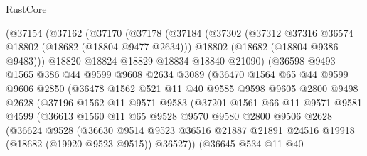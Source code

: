 \begin{lexlean}{RustCore}
\begin{coremodule}
          (@37154
            (@37162
              (@37170
                (@37178
                  (@37184
                    (@37302
                      (@37312 @37316 @36574 @18802 (@18682 (@18804 @9477 @2634)))
                      @18802
                      (@18682 (@18804 @9386 @9483)))
                    @18820
                    @18824
                    @18829
                    @18834
                    @18840
                    @21090)
                  (@36598
                    @9493
                    @1565
                    @386
                    @44
                    @9599
                    @9608
                    @2634
                    @3089
                    (@36470
                      @1564
                      @65
                      @44
                      @9599
                      @9606
                      @2850
                      (@36478
                        @1562
                        @521
                        @11
                        @40
                        @9585
                        @9598
                        @9605
                        @2800
                        @9498
                        @2628
                        (@37196
                          @1562
                          @11
                          @9571
                          @9583
                          (@37201
                            @1561
                            @66
                            @11
                            @9571
                            @9581
                            @4599
                            (@36613
                              @1560
                              @11
                              @65
                              @9528
                              @9570
                              @9580
                              @2800
                              @9506
                              @2628
                              (@36624
                                @9528
                                (@36630
                                  @9514
                                  @9523
                                  @36516
                                  @21887
                                  @21891
                                  @24516
                                  @19918
                                  (@18682 (@19920 @9523 @9515))
                                  @36527))
                              (@36645
                                @534
                                @11
                                @40

\end{coremodule}
\end{lexlean}
